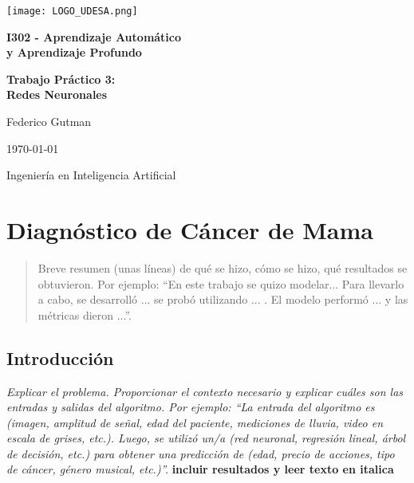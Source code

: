 \documentclass[11pt]{article}
\begin{document}
\begin{titlepage}
    \centering
    \vspace*{2cm}
    \texttt{[image: LOGO\_UDESA.png]}\par
    \vspace{10pt}

    {\LARGE \textbf{I302 - Aprendizaje Automático\\ y Aprendizaje Profundo}\par}
    \vspace{1cm}

    {\LARGE \textbf{Trabajo Práctico 3: \\Redes Neuronales}\par}
    \vfill  %
    
    {\LARGE {Federico Gutman}\par}  %
    \vspace{1cm}
    
    {\Large \today\par}
    \vspace{1cm}
    \Large{Ingeniería en Inteligencia Artificial}
\end{titlepage}

\section{Diagnóstico de Cáncer de Mama}
\begin{abstract}
Breve resumen (unas líneas) de qué se hizo, cómo se hizo, qué resultados se obtuvieron. Por ejemplo: ``En este trabajo se quizo modelar... Para llevarlo a cabo, se desarrolló ... se probó utilizando ... . El modelo performó ... y las métricas dieron ...''.
\end{abstract}

\subsection{Introducción}
\textit{Explicar el problema. Proporcionar el contexto necesario y explicar cuáles son las entradas y salidas del algoritmo. Por ejemplo: “La entrada del algoritmo es (imagen, amplitud de señal, edad del paciente, mediciones de lluvia, video en escala de grises, etc.). Luego, se utilizó un/a (red neuronal, regresión lineal, árbol de decisión, etc.) para obtener una predicción de (edad, precio de acciones, tipo de cáncer, género musical, etc.)”.}
\textbf{incluir resultados y leer texto en italica}
\end{document}

